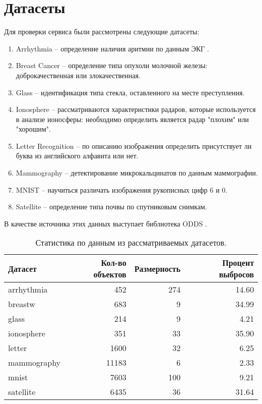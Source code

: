 \section{Датасеты} \label{sec:ch2/sec5}

\noindent Для проверки сервиса были рассмотрены следующие датасеты:
\begin{enumerate}
  \item Arrhythmia -- определение наличия аритмии по данным ЭКГ \cite{guvenir}.
  \item Breast Cancer -- определение типа опухоли молочной железы: доброкачественная или злокачественная.
  \item Glass -- идентификация типа стекла, оставленного на месте преступления.
  \item Ionosphere -- рассматриваются характеристики радаров, которые используется в анализе ионосферы: необходимо определить является радар "плохим" или "хорошим".
  \item Letter Recognition -- по описанию изображения определить присутствует ли буква из английского алфавита или нет.
  \item Mammography -- детектирование микрокальцинатов по данным маммографии.
  \item MNIST -- научиться различать изображения рукописных цифр 6 и 0.
  \item Satellite -- определение типа почвы по спутниковым снимкам.
\end{enumerate}
В качестве источника этих данных выступает библиотека ODDS \cite{odds}.

\begin{table} [htbp]
	\centering
	\caption{Статистика по данным из рассматриваемых датасетов.}\label{tab:stats}%
	\begin{tabular}{lrrr}
		\toprule
		     Датасет & Кол-во объектов & Размерность &  Процент выбросов \\
		\midrule
		  arrhythmia &      452 &         274 &      14.60 \\
		     breastw &      683 &           9 &      34.99 \\
		       glass &      214 &           9 &       4.21 \\
		  ionosphere &      351 &          33 &      35.90 \\
		      letter &     1600 &          32 &       6.25 \\
		 mammography &    11183 &           6 &       2.33 \\
		       mnist &     7603 &         100 &       9.21 \\
		   satellite &     6435 &          36 &      31.64 \\
		\bottomrule
		\hline
	\end{tabular}
\end{table}

